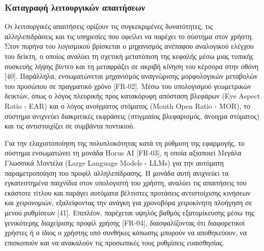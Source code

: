 \documentclass[twoside, a4paper, 11pt]{article}
\newcommand{\textlatin}[1]{\textenglish{#1}}
\begin{document}
\subsubsection{Καταγραφή λειτουργικών απαιτήσεων}
Οι λειτουργικές απαιτήσεις ορίζουν τις συγκεκριμένες δυνατότητες, τις αλληλεπιδράσεις και τις υπηρεσίες που οφείλει να παρέχει το σύστημα στον χρήστη.
Στον πυρήνα του λογισμικού βρίσκεται ο μηχανισμός ανέπαφου αναλογικού ελέγχου του δείκτη, ο οποίος αναλύει τη σχετική μετατόπιση της κεφαλής μέσω μιας τυπικής συσκευής λήψης βίντεο και τη μεταφράζει σε ακριβή κίνηση του κέρσορα στην οθόνη [40]. 
Παράλληλα, ενσωματώνεται μηχανισμός αναγνώρισης μορφολογικών μεταβολών του προσώπου σε πραγματικό χρόνο [FR-02]. Μέσω του υπολογισμού γεωμετρικών δεικτών, όπως ο λόγος πλευρικής προς κατακόρυφη απόσταση βλεφάρων (\textlatin{Eye Aspect Ratio - EAR}) και ο λόγος ανοίγματος στόματος (\textlatin{Mouth Open Ratio - MOR}), το σύστημα ανιχνεύει διακριτικές εκφράσεις (στιγμιαίος βλεφαρισμός, άνοιγμα στόματος) και τις αντιστοιχίζει σε συμβάντα ποντικιού.

Για την ελαχιστοποίηση της πολυπλοκότητας κατά τη ρύθμιση της εφαρμογής, το σύστημα ενσωματώνει τη μονάδα \textlatin{Horus AI} [FR-03], η οποία αξιοποιεί Μεγάλα Γλωσσικά Μοντέλα (\textlatin{Large Language Models - LLMs}) για την αυτόματη παραμετροποίηση του προφίλ αλληλεπίδρασης. 
Η μονάδα αυτή ανιχνεύει τα εγκατεστημένα παιχνίδια στον υπολογιστή του χρήστη, αναλύει τις απαιτήσεις του εκάστοτε τίτλου και παράγει αυτόματα βέλτιστες προτάσεις αντιστοίχισης κινήσεων και χειρονομιών, εξαλείφοντας την ανάγκη για χρονοβόρα χειροκίνητη πλοήγηση σε μενού ρυθμίσεων [41]. 
Επιπλέον, παρέχεται υψηλός βαθμός εξατομίκευσης μέσω της γενικότερης διαχείρισης προφίλ χρήσης [FR-04], διασφαλίζοντας ότι διαφορετικοί χρήστες ή ο ίδιος ο χρήστης υπό συνθήκες κόπωσης μπορούν να αποθηκεύουν, να επισκοπούν και να ανακαλούν τις προσωπικές τους ρυθμίσεις ευαισθησίας.
\end{document}
